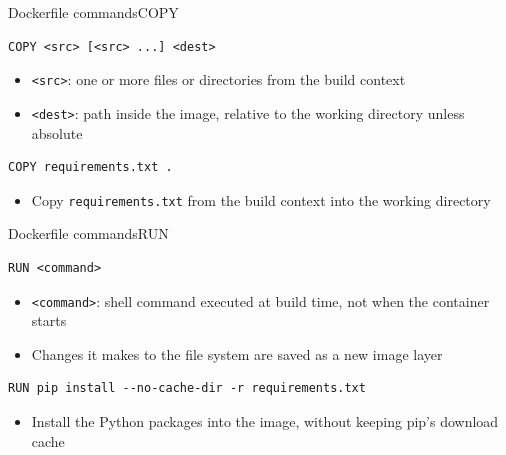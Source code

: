 \documentclass[aspectratio=169]{beamer}
\begin{document}
\begin{frame}[fragile]{Dockerfile commands}{COPY}
  \begin{verbatim}
COPY <src> [<src> ...] <dest>
  \end{verbatim}
  \begin{itemize}
    \item \texttt{<src>}: one or more files or directories from the build context
    \item \texttt{<dest>}: path inside the image, relative to the working directory unless absolute
  \end{itemize}

  \vspace{1em}

  \begin{verbatim}
COPY requirements.txt .
  \end{verbatim}
  \begin{itemize}
    \item Copy \texttt{requirements.txt} from the build context into the working directory
  \end{itemize}

\note{
}
\end{frame}


\begin{frame}[fragile]{Dockerfile commands}{RUN}
  \begin{verbatim}
RUN <command>
  \end{verbatim}
  \begin{itemize}
    \item \texttt{<command>}: shell command executed at build time, not when the container starts
    \item Changes it makes to the file system are saved as a new image layer
  \end{itemize}

  \vspace{1em}

  \begin{verbatim}
RUN pip install --no-cache-dir -r requirements.txt
  \end{verbatim}
  \begin{itemize}
    \item Install the Python packages into the image, without keeping pip's download cache
  \end{itemize}

\note{
}
\end{frame}
\end{document}
